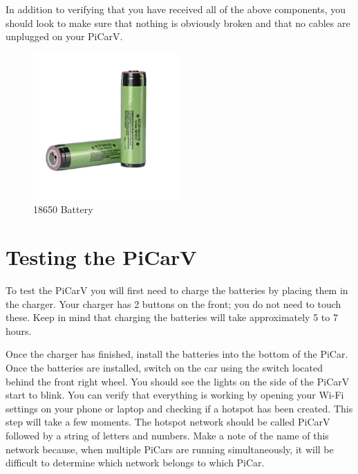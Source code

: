 \documentclass[11pt]{report}
\begin{document}
    In addition to verifying that you have received all of the above components, you should look to make sure that nothing is obviously broken and that no cables are unplugged on your PiCarV.

\begin {figure}[h]
    \centering
    \includegraphics[width=0.5\textwidth]{battery.jpg}
    \caption{18650 Battery}
    \label{fig: 18650 Battery}
\end{figure}
    

\section{Testing the PiCarV}
To test the PiCarV you will first need to charge the batteries by placing them in the charger. Your charger has 2 buttons on the front; you do not need to touch these. Keep in mind that charging the batteries will take approximately 5 to 7 hours.


Once the charger has finished, install the batteries into the bottom of the PiCar. Once the batteries are installed, switch on the car using the switch located behind the front right wheel. You should see the lights on the side of the PiCarV start to blink. You can verify that everything is working by opening your Wi-Fi settings on your phone or laptop and checking if a hotspot has been created. This step will take a few moments. The hotspot network should be called PiCarV followed by a string of letters and numbers. Make a note of the name of this network because, when multiple PiCars are running simultaneously, it will be difficult to determine which network belongs to which PiCar.
\end{document}
